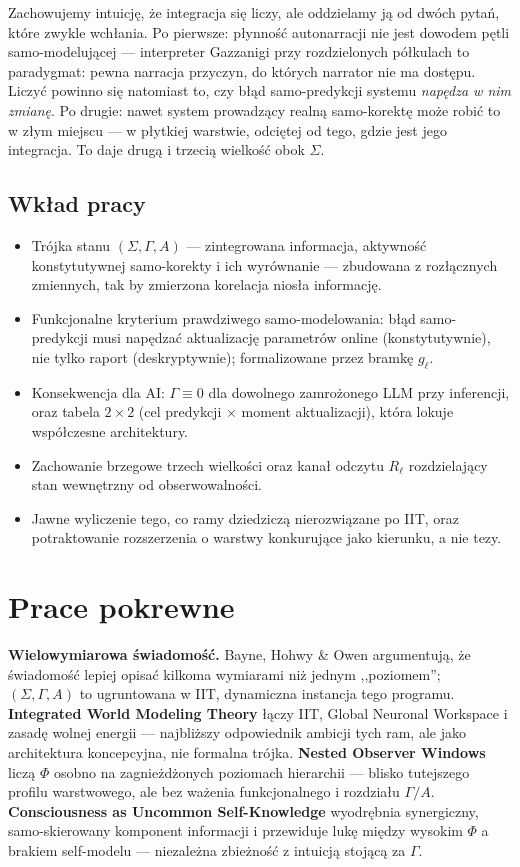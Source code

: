 \documentclass[11pt]{article}
\begin{document}
Zachowujemy intuicję, że integracja się liczy, ale oddzielamy ją od dwóch pytań, które zwykle wchłania. Po pierwsze: płynność autonarracji nie jest dowodem pętli samo-modelującej --- interpreter Gazzanigi przy rozdzielonych półkulach to paradygmat: pewna narracja przyczyn, do których narrator nie ma dostępu. Liczyć powinno się natomiast to, czy błąd samo-predykcji systemu \emph{napędza w nim zmianę}. Po drugie: nawet system prowadzący realną samo-korektę może robić to w złym miejscu --- w płytkiej warstwie, odciętej od tego, gdzie jest jego integracja. To daje drugą i trzecią wielkość obok $\Sigma$.

\subsection*{Wkład pracy}
\begin{itemize}[leftmargin=*]
\item Trójka stanu $(\Sigma,\Gamma,A)$ --- zintegrowana informacja, aktywność konstytutywnej samo-korekty i ich wyrównanie --- zbudowana z rozłącznych zmiennych, tak by zmierzona korelacja niosła informację.
\item Funkcjonalne kryterium prawdziwego samo-modelowania: błąd samo-predykcji musi napędzać aktualizację parametrów online (konstytutywnie), nie tylko raport (deskryptywnie); formalizowane przez bramkę $g_\ell$.
\item Konsekwencja dla AI: $\Gamma\equiv0$ dla dowolnego zamrożonego LLM przy inferencji, oraz tabela $2\times2$ (cel predykcji $\times$ moment aktualizacji), która lokuje współczesne architektury.
\item Zachowanie brzegowe trzech wielkości oraz kanał odczytu $R_\ell$ rozdzielający stan wewnętrzny od obserwowalności.
\item Jawne wyliczenie tego, co ramy dziedziczą nierozwiązane po IIT, oraz potraktowanie rozszerzenia o warstwy konkurujące jako kierunku, a nie tezy.
\end{itemize}

\section{Prace pokrewne}

\textbf{Wielowymiarowa świadomość.} Bayne, Hohwy \& Owen \cite{bayne2016} argumentują, że świadomość lepiej opisać kilkoma wymiarami niż jednym ,,poziomem''; $(\Sigma,\Gamma,A)$ to ugruntowana w IIT, dynamiczna instancja tego programu. \textbf{Integrated World Modeling Theory} \cite{safron2020} łączy IIT, Global Neuronal Workspace i zasadę wolnej energii --- najbliższy odpowiednik ambicji tych ram, ale jako architektura koncepcyjna, nie formalna trójka. \textbf{Nested Observer Windows} \cite{riddle2024} liczą $\Phi$ osobno na zagnieżdżonych poziomach hierarchii --- blisko tutejszego profilu warstwowego, ale bez ważenia funkcjonalnego i rozdziału $\Gamma/A$. \textbf{Consciousness as Uncommon Self-Knowledge} \cite{usk2026} wyodrębnia synergiczny, samo-skierowany komponent informacji i przewiduje lukę między wysokim $\Phi$ a brakiem self-modelu --- niezależna zbieżność z intuicją stojącą za $\Gamma$.
\end{document}
